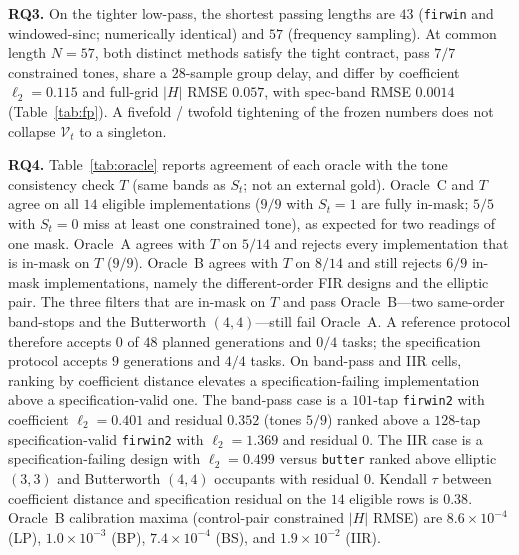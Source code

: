 \documentclass{article}
\begin{document}
\noindent\textbf{RQ3.}
On the tighter low-pass, the shortest passing lengths are $43$
(\texttt{firwin} and windowed-sinc; numerically identical) and $57$
(frequency sampling).
At common length $N=57$, both distinct methods satisfy the tight
contract, pass $7/7$ constrained tones, share a $28$-sample group
delay, and differ by coefficient $\ell_2=0.115$ and full-grid
$\lvert H\rvert$ RMSE $0.057$, with spec-band RMSE $0.0014$
(Table~\ref{tab:fp}).
A fivefold / twofold tightening of the frozen numbers does not collapse
$\mathcal{V}_t$ to a singleton.

\noindent\textbf{RQ4.}
Table~\ref{tab:oracle} reports agreement of each oracle with the tone
consistency check $T$ (same bands as $S_t$; not an external gold).
Oracle~C and $T$ agree on all $14$ eligible implementations
($9/9$ with $S_t=1$ are fully in-mask; $5/5$ with $S_t=0$ miss at
least one constrained tone), as expected for two readings of one mask.
Oracle~A agrees with $T$ on $5/14$ and rejects every implementation
that is in-mask on $T$ ($9/9$).
Oracle~B agrees with $T$ on $8/14$ and still rejects $6/9$
in-mask implementations, namely the different-order FIR designs
and the elliptic pair.
The three filters that are in-mask on $T$ and pass Oracle~B---two
same-order band-stops and the Butterworth $(4,4)$---still fail
Oracle~A.
A reference protocol therefore accepts $0$ of $48$ planned generations
and $0/4$ tasks; the specification protocol accepts $9$ generations
and $4/4$ tasks.
On band-pass and IIR cells, ranking by coefficient distance elevates a
specification-failing implementation above a specification-valid one.
The band-pass case is a $101$-tap \texttt{firwin2} with coefficient
$\ell_2=0.401$ and residual $0.352$ (tones $5/9$) ranked above a
$128$-tap specification-valid \texttt{firwin2} with $\ell_2=1.369$
and residual $0$.
The IIR case is a specification-failing design with
$\ell_2=0.499$ versus \texttt{butter} ranked above elliptic
$(3,3)$ and Butterworth $(4,4)$ occupants with residual $0$.
Kendall $\tau$ between coefficient distance and specification residual
on the $14$ eligible rows is $0.38$.
Oracle~B calibration maxima (control-pair constrained
$\lvert H\rvert$ RMSE) are $8.6\times 10^{-4}$ (LP),
$1.0\times 10^{-3}$ (BP), $7.4\times 10^{-4}$ (BS), and
$1.9\times 10^{-2}$ (IIR).
\end{document}
